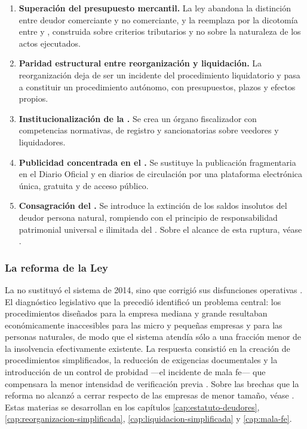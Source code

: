 \begin{enumerate}
  \item \textbf{Superación del presupuesto mercantil.} La ley abandona la distinción
  entre deudor comerciante y no comerciante, y la reemplaza por la dicotomía entre
  \empresadeudora{} y \personadeudora{}, construida sobre criterios tributarios y no
  sobre la naturaleza de los actos ejecutados.

  \item \textbf{Paridad estructural entre reorganización y liquidación.} La
  reorganización deja de ser un incidente del procedimiento liquidatorio y pasa a
  constituir un procedimiento autónomo, con presupuestos, plazos y efectos propios.

  \item \textbf{Institucionalización de la \Superir{}.} Se crea un órgano fiscalizador
  con competencias normativas, de registro y sancionatorias sobre veedores y
  liquidadores.

  \item \textbf{Publicidad concentrada en el \boletin{}.} Se sustituye la publicación
  fragmentaria en el Diario Oficial y en diarios de circulación por una plataforma
  electrónica única, gratuita y de acceso público.

  \item \textbf{Consagración del \discharge{}.} Se introduce la extinción de los saldos
  insolutos del deudor persona natural, rompiendo con el principio de responsabilidad
  patrimonial universal e ilimitada del  \citeyearpar{codigo-civil}. Sobre el
  alcance de esta ruptura, véase \textcite{doc-discharge-modelo}.
\end{enumerate}

\subsubsection{La reforma de la Ley }

La \Lreforma{} \citeyearpar{ley-21563} no sustituyó el sistema de 2014, sino que corrigió
sus disfunciones operativas \parencite{aj-ley21563, aj-reporte-21563}. El diagnóstico
legislativo que la precedió identificó un problema central:
los procedimientos diseñados para la empresa mediana y grande resultaban
económicamente inaccesibles para las micro y pequeñas empresas y para las personas
naturales, de modo que el sistema atendía sólo a una fracción menor de la insolvencia
efectivamente existente. La respuesta consistió en la creación de procedimientos
simplificados, la reducción de exigencias documentales y la introducción de un control
de probidad ---el incidente de mala fe--- que compensara la menor intensidad de
verificación previa \parencite{aj-prado-modificaciones}. Sobre las brechas que la reforma
no alcanzó a cerrar respecto de las empresas de menor tamaño, véase
\textcite{prensa-df-brechas-mypes}. Estas materias se desarrollan en los capítulos
\ref{cap:estatuto-deudores}, \ref{cap:reorganizacion-simplificada},
\ref{cap:liquidacion-simplificada} y \ref{cap:mala-fe}.


